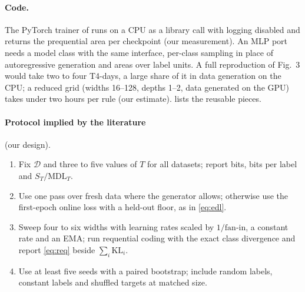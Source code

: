 \documentclass[11pt]{article}
\newcommand{\Dt}{\mathcal{D}}\newcommand{\PT}{\mathcal{P}_T}\newcommand{\prog}{\mathrm{P}}
\newcommand{\KL}{\mathrm{KL}}\newcommand{\MDL}{\mathrm{MDL}}\newcommand{\Poly}{\mathrm{Poly}}
\theoremstyle{tight}
\begin{document}
\paragraph{Code.} The PyTorch trainer of \citet{epiplexitycode} runs on a CPU as a library call with
logging disabled and returns the prequential area per checkpoint (our measurement). An MLP port needs a
model class with the same interface, per-class sampling in place of autoregressive generation and
areas over label units. A full reproduction of Fig.~3 would take two to four T4-days, a large share of
it in data generation on the CPU; a reduced grid (widths 16--128, depths 1--2, data generated on the
GPU) takes under two hours per rule (our estimate).  lists the reusable pieces.

\paragraph{Protocol implied by the literature} (our design).
\begin{enumerate}
\item Fix $\Dt$ and three to five values of $T$ for all datasets; report bits, bits per label and
$S_T/\MDL_T$.
\item Use one pass over fresh data where the generator allows; otherwise use the first-epoch online
loss with a held-out floor, as in \eqref{eq:edl}.
\item Sweep four to six widths with learning rates scaled by $1/\text{fan-in}$, a constant rate and an
EMA; run requential coding with the exact class divergence and report \eqref{eq:req} beside
$\sum_i\KL_i$.
\item Use at least five seeds with a paired bootstrap; include random labels, constant labels and
shuffled targets at matched size.
\end{enumerate}
\end{document}
